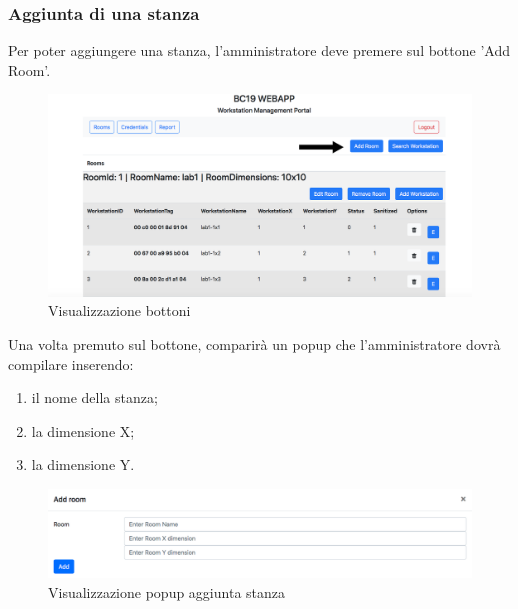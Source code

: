 \subsubsection{Aggiunta di una stanza}
Per poter aggiungere una stanza, l'amministratore deve premere sul bottone 'Add Room'.
\begin{figure}[H]
	\centering
	\includegraphics[width=15cm]{res/images/bottoneAddRoom.png}
	\caption{Visualizzazione bottoni}
\end{figure}
Una volta premuto sul bottone, comparirà un popup che l'amministratore dovrà compilare inserendo:
\begin{enumerate}
\item il nome della stanza;
\item la dimensione X;
\item la dimensione Y.
\end{enumerate}
\begin{figure}[H]
	\centering
	\includegraphics[width=15cm]{res/images/aggiungiStanza1.png}
	\caption{Visualizzazione popup aggiunta stanza}
\end{figure}

